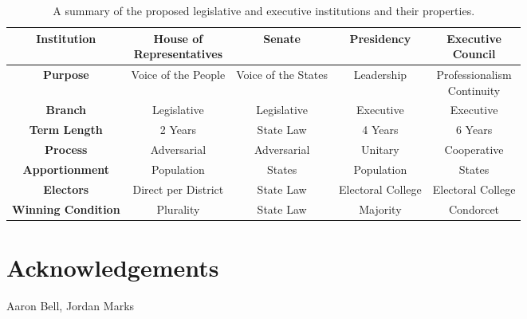 \documentclass{article}
\begin{document}
\begin{table}[ht]
\centering
\renewcommand{\arraystretch}{1.5}
\begin{tabular}{|c|c|c|c|c|}
\hline
\textbf{Institution} & \makecell{House of \\ Representatives} & Senate & Presidency & \makecell{Executive \\ Council}  \\
\hline
\textbf{Purpose} & Voice of the People & Voice of the States & Leadership & \makecell{Professionalism \\ Continuity} \\
\hline
\textbf{Branch} & Legislative & Legislative & Executive & Executive \\
\hline
\textbf{Term Length} & 2 Years & State Law & 4 Years & 6 Years \\
\hline
\textbf{Process} & Adversarial & Adversarial & Unitary & Cooperative \\
\hline
\textbf{Apportionment} & Population & States & Population & States  \\
\hline
\textbf{Electors} & Direct per District & State Law  & Electoral College & Electoral College  \\
\hline
\textbf{Winning Condition} & Plurality & State Law & Majority & Condorcet  \\
\hline
\end{tabular}
\caption{A summary of the proposed legislative and executive institutions and their properties. }
\end{table}



\section{Acknowledgements}

Aaron Bell, Jordan Marks
\end{document}
